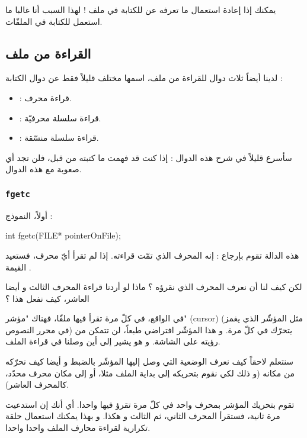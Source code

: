 
يمكنك إذا إعادة استعمال ما تعرفه عن
للكتابة في ملف ! لهذا السبب أنا غالبا ما استعمل
للكتابة في الملفّات.

\subsection{القراءة من ملف}
لدينا أيضاً ثلاث دوال للقراءة من ملف، اسمها مختلف قليلاً فقط عن دوال الكتابة :
\begin{itemize}
  \item {} :
 قراءة محرف.
  \item {} :
قراءة سلسلة محرفيّة.
  \item {} :
قراءة سلسلة منسّقة.
\end{itemize}

سأسرع قليلاً في شرح هذه الدوال : إذا كنت قد فهمت ما كتبته من قبل، فلن تجد أي صعوبة مع هذه الدوال.

\subsubsection{\texttt{fgetc}}
أولاً، النموذج :

\begin{Csource}
int fgetc(FILE* pointerOnFile);
\end{Csource}

هذه الدالة تقوم بإرجاع
 :
إنه المحرف الذي تمّت قراءته.
إذا لم تقرأ أيّ محرف، فستعيد القيمة
.

\begin{question}
لكن كيف لنا أن نعرف المحرف الذي نقرؤه ؟ ماذا لو أردنا قراءة المحرف الثالث و أيضا العاشر، كيف نفعل هذا ؟
\end{question}

في الواقع، في كلّ مرة تقرأ فيها ملفّا، فهناك "مؤشر"
(\textenglish{cursor})
(مثل المؤشّر الذي يغمز في محرر النصوص) يتحرّك في كلّ مرة. و هذا المؤشّر افتراضي طبعاً، لن تتمكن من رؤيته على الشاشة. و هو يشير إلى أين وصلنا في قراءة الملف.

سنتعلم لاحقاً كيف نعرف الوضعية التي وصل إليها المؤشّر بالضبط و أيضا كيف نحرّكه من مكانه (و ذلك لكي نقوم بتحريكه إلى بداية الملف مثلا، أو إلى مكان محرف محدّد، كالمحرف العاشر).

تقوم بتحريك المؤشر بمحرف واحد في كلّ مرة تقرؤ فيها واحدا. أي أنك إن استدعيت
مرة ثانية، فستقرأ المحرف الثاني، ثم الثالث و هكذا. و بهذا يمكنك استعمال حلقة تكرارية لقراءة محارف الملف واحدا واحدا.

